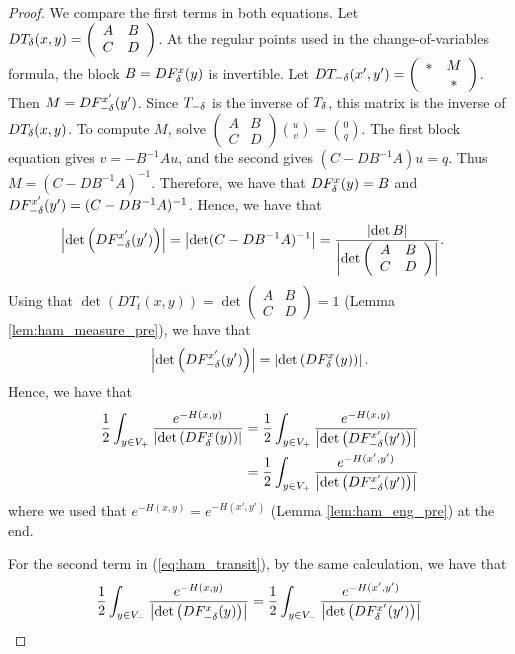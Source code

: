\begin{proof}
We compare the first terms in both equations. Let $DT_{\delta}(x,y)=\left(\begin{array}{cc}
A & B\\
C & D
\end{array}\right)$. At the regular points used in the change-of-variables formula, the
block $B=DF^{x}_{\delta}(y)$ is invertible. Let $DT_{-\delta}(x',y')=\left(\begin{array}{cc}
* & M\\*
 & *
\end{array}\right)$. Then $M=DF^{x'}_{-\delta}(y')$. Since $T_{-\delta}$ is the inverse
of $T_{\delta}$, this matrix is the inverse of $DT_{\delta}(x,y)$.
To compute $M$, solve $\left(\begin{array}{cc}
A & B\\
C & D
\end{array}\right)\binom{u}{v}=\binom{0}{q}$. The first block equation gives $v=-B^{-1}Au$, and the second gives
$(C-DB^{-1}A)u=q$. Thus $M=(C-DB^{-1}A)^{-1}$. Therefore, we have
that $DF^{x}_{\delta}(y)=B$ and $DF^{x'}_{-\delta}(y')=(C-DB^{-1}A)^{-1}$.
Hence, we have that
\begin{align*}
\left|\det\left(DF^{x'}_{-\delta}(y')\right)\right| & =\left|\det(C-DB^{-1}A)^{-1}\right|=\frac{\left|\det B\right|}{\left|\det\left(\begin{array}{cc}
A & B\\
C & D
\end{array}\right)\right|}.
\end{align*}
Using that $\det\left(DT_{t}(x,y)\right)=\det\left(\begin{array}{cc}
A & B\\
C & D
\end{array}\right)=1$ (Lemma \ref{lem:ham_measure_pre}), we have that
\[
\left|\det\left(DF^{x'}_{-\delta}(y')\right)\right|=\left|\det\left(DF^{x}_{\delta}(y)\right)\right|.
\]
Hence, we have that
\begin{align*}
\frac{1}{2}\int_{y\in V_{+}}\frac{e^{-H(x,y)}}{\left|\det\left(DF^{x}_{\delta}(y)\right)\right|} & =\frac{1}{2}\int_{y\in V_{+}}\frac{e^{-H(x,y)}}{\left|\det\left(DF^{x'}_{-\delta}(y')\right)\right|}\\
 & =\frac{1}{2}\int_{y\in V_{+}}\frac{e^{-H(x',y')}}{\left|\det\left(DF^{x'}_{-\delta}(y')\right)\right|}
\end{align*}
where we used that $e^{-H(x,y)}=e^{-H(x',y')}$ (Lemma \ref{lem:ham_eng_pre})
at the end. 

For the second term in (\ref{eq:ham_transit}), by the same calculation,
we have that
\[
\frac{1}{2}\int_{y\in V_{-}}\frac{e^{-H(x,y)}}{\left|\det\left(DF^{x}_{-\delta}(y)\right)\right|}=\frac{1}{2}\int_{y\in V_{-}}\frac{e^{-H(x',y')}}{\left|\det\left(DF^{x'}_{\delta}(y')\right)\right|}
\]
\end{proof}

